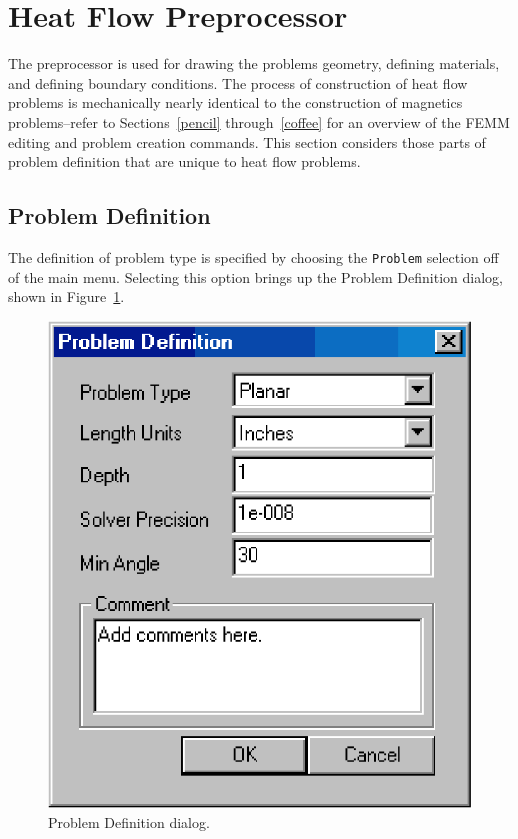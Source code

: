 \section{Heat Flow Preprocessor}

The preprocessor is used for drawing the problems geometry, defining
materials, and defining boundary conditions. The process of construction of heat
flow problems is mechanically nearly identical to the construction of
magnetics problems--refer to Sections~\ref{pencil} through~\ref{coffee} for
an overview of the FEMM editing and problem creation commands. This section
considers those parts of problem definition that are unique to heat flow problems.

\subsection{Problem Definition}

The definition of problem type is specified by choosing the
\texttt{Problem} selection off of the main menu. Selecting this
option brings up the Problem Definition dialog, shown in
Figure~\ref{hfig5}.

\begin{figure}[htbp]
\centerline{\includegraphics{belaman6.eps}}
\caption{Problem Definition dialog.}
\label{hfig5}
\end{figure}

